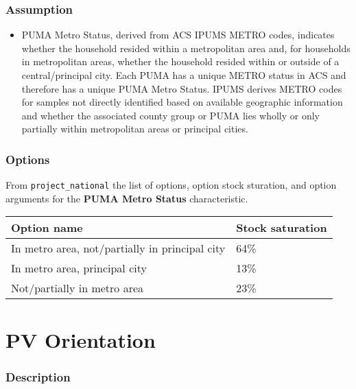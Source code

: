 \subsubsection{Assumption}\label{assumption-73}

\begin{itemize}
 
\item
  \textquotesingle PUMA Metro Status\textquotesingle, derived from ACS
  IPUMS METRO codes, indicates whether the household resided within a
  metropolitan area and, for households in metropolitan areas, whether
  the household resided within or outside of a central/principal city.
  Each PUMA has a unique METRO status in ACS and therefore has a unique
  PUMA Metro Status. IPUMS derives METRO codes for samples not directly
  identified based on available geographic information and whether the
  associated county group or PUMA lies wholly or only partially within
  metropolitan areas or principal cities.
\end{itemize}

\subsubsection{Options}\label{options-130}

From \texttt{project\_national} the list of options, option stock
sturation, and option arguments for the \textbf{PUMA Metro Status}
characteristic.

\begin{longtable}[]{@{}ll@{}}
\toprule\noalign{}
Option name & Stock saturation \\
\midrule\noalign{}
\endhead
\bottomrule\noalign{}
\endlastfoot
In metro area, not/partially in principal city & 64\% \\
In metro area, principal city & 13\% \\
Not/partially in metro area & 23\% \\
\end{longtable}

\section{PV Orientation}\label{pv_orientation}

\subsubsection{Description}\label{description-127}


